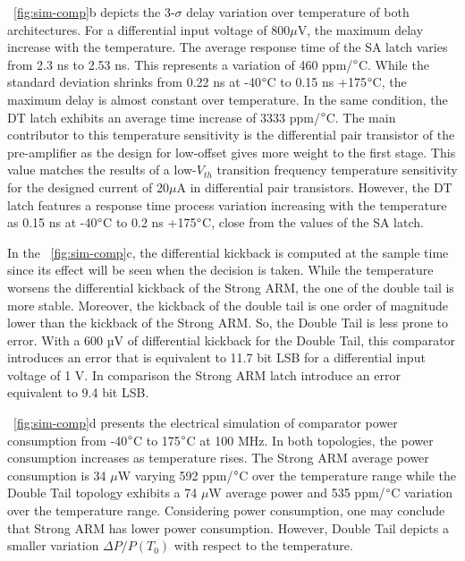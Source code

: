 \figurename~\ref{fig:sim-comp}b depicts the 3-\(\sigma \) delay variation over temperature of both architectures. For a differential input voltage of 800\(\mu \)V, the maximum delay increase with the temperature. The average response time of the SA latch varies from 2.3 ns to 2.53 ns. This represents a variation of 460 ppm/\(\degree \)C. While the standard deviation shrinks from 0.22 ns at -40\(\degree \)C to 0.15 ns +175\(\degree \)C, the maximum delay is almost constant over temperature. In the same condition, the DT latch exhibits an average time increase of 3333 ppm/\(\degree \)C. The main contributor to this temperature sensitivity is the differential pair transistor of the pre-amplifier as the design for low-offset gives more weight to the first stage. This value matches the results of a low-\(V_{th} \) transition frequency temperature sensitivity for the designed current of 20\(\mu \)A in differential pair transistors. However, the DT latch features a response time process variation increasing with the temperature as  0.15 ns at -40\(\degree \)C to 0.2 ns +175\(\degree \)C, close from the values of the SA latch.

In the \figurename~\ref{fig:sim-comp}c, the differential kickback is computed at the sample time since its effect will be seen when the decision is taken. While the temperature worsens the differential kickback of the Strong ARM, the one of the double tail is more stable. Moreover, the kickback of the double tail is one order of magnitude lower than the kickback of the Strong ARM\@. So, the Double Tail is less prone to error. With a 600 µV of differential kickback for the Double Tail, this comparator introduces an error that is equivalent to 11.7 bit LSB for a differential input voltage of 1 V. In comparison the Strong ARM latch introduce an error equivalent to 9.4 bit LSB\@.

\figurename~\ref{fig:sim-comp}d presents the electrical simulation of comparator power consumption from -40\(\degree \)C to 175\(\degree \)C at 100 MHz. In both topologies, the power consumption increases as temperature rises. The Strong ARM average power consumption is 34 \(\mu \)W varying 592 ppm/\(\degree \)C over the temperature range while the Double Tail topology exhibits a 74 \(\mu \)W average power and 535 ppm/\(\degree \)C variation over the temperature range. Considering power consumption, one may conclude that Strong ARM has lower power consumption. However, Double Tail depicts a smaller variation \(\Delta P/P(T_0)\) with respect to the temperature.


